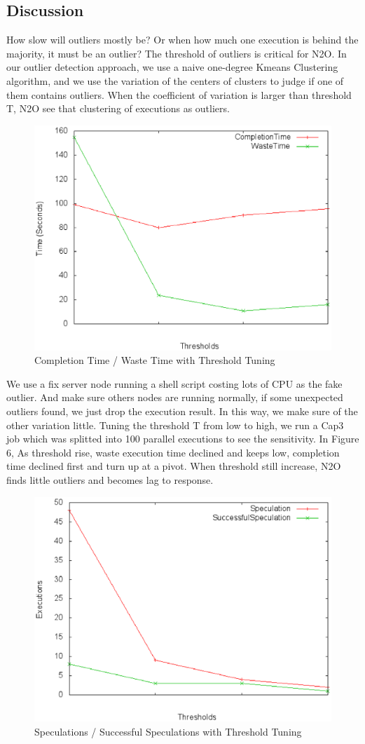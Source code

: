 \subsection{Discussion}

How slow will outliers mostly be? Or when how much one execution is behind the majority, it must be an outlier? The threshold of outliers is critical for N2O. In our outlier detection approach, we use a naive one-degree Kmeans Clustering algorithm, and we use the variation of the centers of clusters to judge if one of them contains outliers. When the coefficient of variation is larger than threshold T, N2O see that clustering of executions as outliers.

\begin{figure}
\centering
\includegraphics[width=0.62\columnwidth]{figures/threshold&completiontime.eps}
\caption{Completion Time / Waste Time with Threshold Tuning}
\label{figure:thresholdtuning}
\end{figure}

We use a fix server node running a shell script costing lots of CPU as the fake outlier. And make sure others nodes are running normally, if some unexpected outliers found, we just drop the execution result. In this way, we make sure of the other variation little. Tuning the threshold T from low to high, we run a Cap3 job which was splitted into 100 parallel executions to see the sensitivity. In Figure 6, As threshold rise, waste execution time declined and keeps low, completion time declined first and  turn up at a pivot. When threshold still increase, N2O finds little outliers and becomes lag to response. 

\begin{figure}
\centering
\includegraphics[width=0.62\columnwidth]{figures/threshold&speculation.eps}
\caption{Speculations / Successful Speculations with Threshold Tuning}
\label{figure:yetanotherthresholdtuning}
\end{figure}

